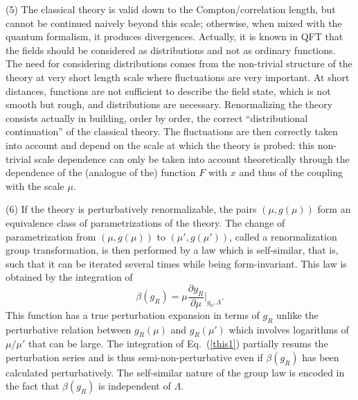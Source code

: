 \documentclass[floatfix,twocolumn,preprintnumbers,amsmath,amssymb,prb]{revtex4}
\begin{document}
{(5) The classical theory is valid down to the Compton/correlation
length, but cannot be continued naively beyond this scale;
otherwise, when mixed with the quantum formalism, it produces
divergences. Actually, it is known in QFT that the fields should
be considered as distributions and not as ordinary functions.
The need for considering distributions comes from the non-trivial structure of the
theory at very short length scale where fluctuations are very
important. At short distances, functions
are not sufficient to describe the field state, which is not smooth
but rough, and distributions are necessary. Renormalizing the
theory consists actually in building, order by order, the correct
``distributional continuation'' of the classical theory. The
fluctuations are then correctly taken into account and depend on
the scale at which the theory is probed: this non-trivial scale
dependence can only be taken into account theoretically through
the dependence of the (analogue of the) function
$F$ with $x$ and thus of the coupling with the scale
$\mu$.

(6) If the theory is perturbatively renormalizable, the pairs
$(\mu,g(\mu))$ form an equivalence class of parametrizations of
the theory. The change of parametrization from $(\mu,g(\mu))$ to
$(\mu',g(\mu'))$, called a renormalization group transformation,
is then performed by a law which is self-similar, that is, such
that it can be iterated several times while being
form-invariant.\cite{kovalev99,shirkov01} This law is obtained by
the integration of 
\begin{equation}
\beta(g_R)=\mu\frac{\partial
g_R}{\partial\mu}\bigg|_{g_0,\Lambda}.
\label{this1}
\end{equation}
This function has a true perturbation expansion in terms of $g_R$
unlike the perturbative relation between
$g_R(\mu)$ and $g_R(\mu')$ which involves logarithms of $\mu/\mu'$
that can be large. The integration of Eq.~(\ref{this1}) 
partially resums the perturbation series and is thus
semi-non-perturbative even if
$\beta(g_R)$ has been calculated perturbatively. The self-similar
nature of the group law is encoded in the fact that $\beta(g_R)$
is independent of
$\Lambda$.\cite{lebellac91}

}
\end{document}
